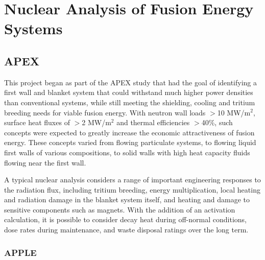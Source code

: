\chapter{Nuclear Analysis of Fusion Energy Systems}

\section{\acrfull{APEX}}

This project began as part of the APEX study that had the goal of identifying
a first wall and blanket system that could withstand much higher power
densities than conventional systems, while still meeting the shielding, cooling
and tritium breeding needs for viable fusion energy.  With neutron wall loads
$>$10 MW/m$^2$, surface heat fluxes of $>$2 MW/m$^2$ and thermal efficiencies
$>$40\%, such concepts were expected to greatly increase the economic
attractiveness of fusion energy.  These concepts varied from flowing
particulate systems, to flowing liquid first walls of various compositions, to
solid walls with high heat capacity fluids flowing near the first wall.

A typical nuclear analysis considers a range of important engineering
responses to the radiation flux, including tritium breeding, energy
multiplication, local heating and radiation damage in the blanket system
itself, and heating and damage to sensitive components such as magnets.  With
the addition of an activation calculation, it is possible to consider decay
heat during off-normal conditions, dose rates during maintenance, and waste
disposal ratings over the long term.

\subsection{\acrfull{APPLE}}

